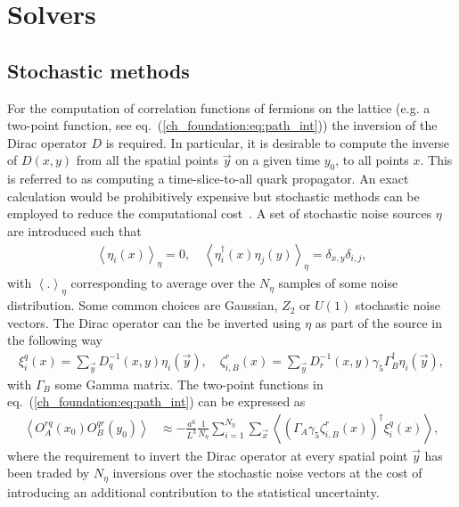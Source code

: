 
\chapter{Solvers}
\label{appex_solvers}

\section{Stochastic methods}

For the computation of correlation functions of fermions on the lattice (e.g. a two-point function, see eq.~(\ref{ch_foundation:eq:path_int})) the inversion of the Dirac operator $D$ is required. In particular, it is desirable to compute the inverse of $D(x,y)$ from all the spatial points $\vec{y}$ on a given time $y_0$, to all points $x$. This is referred to as computing a time-slice-to-all quark propagator. An exact calculation would be prohibitively expensive but stochastic methods can be employed to reduce the computational cost~\citep{Luscher:2010ae}. A set of stochastic noise sources $\eta$ are introduced such that
\begin{gather}
\left<\eta_i(x)\right>_{\eta}=0, \quad \left<\eta_i^{\dagger}(x)\eta_j(y)\right>_{\eta}=\delta_{x,y}\delta_{i,j},
\end{gather}
with $\left<.\right>_{\eta}$ corresponding to average over the $N_{\eta}$ samples of some noise distribution. Some common choices are Gaussian, $Z_2$ or $U(1)$ stochastic noise vectors. The Dirac operator can the be inverted using $\eta$ as part of the source in the following way
\begin{gather}
\xi_i^q(x)=\sum_{\vec{y}}D^{-1}_q(x,y)\eta_i(\vec{y}), \quad \zeta_{i,B}^r(x)=\sum_{\vec{y}}D^{-1}_r(x,y)\gamma_5\Gamma_B^{\dagger}\eta_i(\vec{y}),
\end{gather}
with $\Gamma_B$ some Gamma matrix. The two-point functions in eq.~(\ref{ch_foundation:eq:path_int}) can be expressed as
\begin{align}
\left<O^{rq}_A(x_0)O^{qr}_B(y_0)\right>&\approx -\frac{a^6}{L^3}\frac{1}{N_{\eta}}\sum_{i=1}^{N_{\eta}}\sum_{\vec{x}}\left<(\Gamma_A\gamma_5\zeta^r_{i,B}(x))^{\dagger}\xi^q_i(x)\right>,
\end{align}
where the requirement to invert the Dirac operator at every spatial point $\vec{y}$ has been traded by $N_\eta$ inversions over the stochastic noise vectors at the cost of introducing an additional contribution to the statistical uncertainty. 

